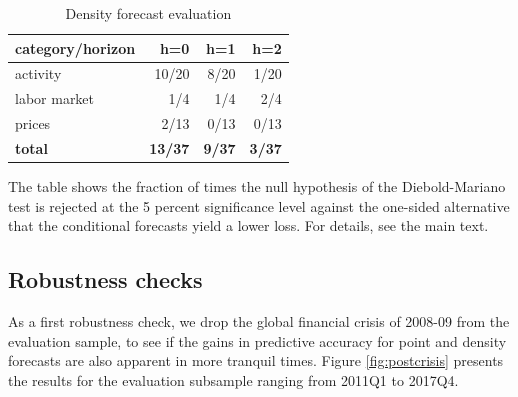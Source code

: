 \documentclass[notitlepage,a4paper,12pt]{article}
\begin{document}
\begin{table}[htb!]
    \centering
    \caption{Density forecast evaluation \label{table:dm_crps}}
    \begin{threeparttable}
        \begin{tabular}{lrrr}
        \toprule
        category/horizon & h=0 & h=1 & h=2 \\ 
        \midrule
        activity & 10/20 & 8/20 & 1/20 \\ 
        labor market &  1/4 & 1/4 & 2/4  \\ 
        prices & 2/13 & 0/13 & 0/13 \\ 
        \textbf{total} & \textbf{13/37} & \textbf{9/37} & \textbf{3/37} \\
        \bottomrule
        \end{tabular}
        \begin{tablenotes}
            \scriptsize
            \item The table shows the fraction of times the null hypothesis of the Diebold-Mariano test is rejected at the 5 percent significance level against the one-sided alternative that the conditional forecasts yield a lower loss. For details, see the main text.
        \end{tablenotes}
    \end{threeparttable}
\end{table}

\subsection{Robustness checks}

As a first robustness check, we drop the global financial crisis of 2008-09 from the evaluation sample, to see if the gains in predictive accuracy for point and density forecasts are also apparent in more tranquil times. Figure \ref{fig:postcrisis} presents the results for the evaluation subsample ranging from 2011Q1 to 2017Q4.
\end{document}
